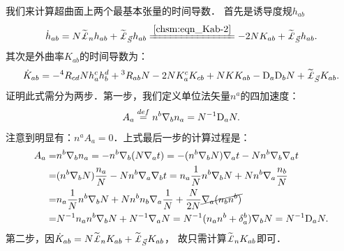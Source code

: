 

我们来计算超曲面上两个最基本张量的时间导数．
首先是诱导度规$h_{ab}$
\begin{equation}\label{chsm:eqn_Lie-t-hab}
    \dot{h}_{ab} = N \widetilde{\Lie}_{n}{h}_{ab}
    +\widetilde{\Lie}_{\vec{S}}{h}_{ab}
    \xlongequal{\ref{chsm:eqn_Kab-2}}
    -2N K_{ab}
    +\widetilde{\Lie}_{\vec{S}}{h}_{ab} .
\end{equation}
其次是外曲率$K_{ab}$的时间导数为：
\setlength{\mathindent}{0em}
\begin{equation}\label{chsm:eqn_Lie-t-Kab}
    \dot{K}_{ab} = -{}^4 R_{cd} N h^c_a h^d_b + {}^3 R_{ab} N - 2N K^c_a K_{cb}
     + N K K_{ab} - {\rm D}_a {\rm D}_b N +\widetilde{\Lie}_{\vec{S}}{K}_{ab}.
\end{equation}\setlength{\mathindent}{2em}
证明此式需分为两步．第一步，我们定义{\heiti 单位法矢量$n^a$的四加速度}：
\begin{equation}\label{chsm:eqn_Acceleration}
    A_a \overset{def}{=} n^b \nabla_b n_a =N^{-1} {\rm D}_a N .
\end{equation}
注意到明显有：$n^a A_a =0 $．上式最后一步的计算过程是：  %
\begin{align*}
    A_a =& n^b \nabla_b n_a = -n^b\nabla_b ( N \nabla_a t )
    = -(n^b\nabla_b  N) \nabla_a t  -  N n^b\nabla_b  \nabla_a t \\
    =& (n^b\nabla_b  N) \frac{n_a}{N} -  N n^b\nabla_a  \nabla_b t 
    = n_a \frac{1}{N} n^b\nabla_b N   +  N n^b\nabla_a  \frac{n_b}{N}  \\
    =& n_a \frac{1}{N} n^b\nabla_b N + N n^b n_b \nabla_a \frac{1}{N} 
    +  \frac{N}{2N} {\cancel{\nabla_a  (n_bn^b)}} \\
    =& N^{-1} n_a n^b\nabla_b N + N^{-1} \nabla_a N
    = N^{-1} (n_a n^b + \delta^b_a )\nabla_b N
    =N^{-1} {\rm D}_a N .
\end{align*} %
第二步，因$\dot{K}_{ab} = N \widetilde{\Lie}_{n}{K}_{ab} +\widetilde{\Lie}_{\vec{S}}{K}_{ab}$，
故只需计算$\widetilde{\Lie}_{n}{K}_{ab}$即可．
